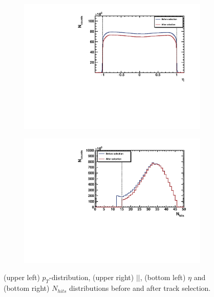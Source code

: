 \begin{figure}[ht]
\begin{subfigure}{.49\textwidth}
        \includegraphics[width=1.\linewidth]{Figures/Eta.pdf}
    \end{subfigure}
    \begin{subfigure}{.49\textwidth}
        \centering
        \includegraphics[width=1.\linewidth]{Figures/Nhits.pdf}
    \end{subfigure}
    \caption{(upper left) $p_T$-distribution, (upper right) $|$\DCA$|$, (bottom left) $\eta$ and (bottom right) $N_{hits}$ distributions before and after track selection.}
    \label{fig:TrackSelection}
\end{figure}


